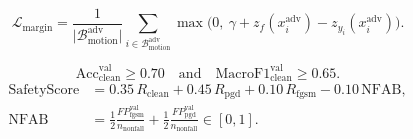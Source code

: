 \begin{equation}\label{eq:margin-loss-future}
  \mathcal{L}_{\mathrm{margin}} = \frac{1}{\lvert\mathcal{B}^{\mathrm{adv}}_{\mathrm{motion}}\rvert}
     \sum_{i\in\mathcal{B}^{\mathrm{adv}}_{\mathrm{motion}}} \max\!\big(0,\ \gamma + z_f(x_i^{\mathrm{adv}}) - z_{y_i}(x_i^{\mathrm{adv}})\big).
\end{equation}

\begin{equation}\label{eq:v2-guard}
  \mathrm{Acc}^{\mathrm{val}}_{\mathrm{clean}} \ge 0.70
  \quad\text{and}\quad
  \mathrm{MacroF1}^{\mathrm{val}}_{\mathrm{clean}} \ge 0.65 .
\end{equation}
\begin{align}
  \mathrm{SafetyScore} &= 0.35\,R_{\mathrm{clean}} + 0.45\,R_{\mathrm{pgd}} + 0.10\,R_{\mathrm{fgsm}} - 0.10\,\mathrm{NFAB}, \label{eq:safetyscore}\\
  \mathrm{NFAB} &= \tfrac{1}{2}\frac{FP^{\mathrm{val}}_{\mathrm{fgsm}}}{n_{\mathrm{nonfall}}} + \tfrac{1}{2}\frac{FP^{\mathrm{val}}_{\mathrm{pgd}}}{n_{\mathrm{nonfall}}} \in [0,1]. \label{eq:nfab}
\end{align}



